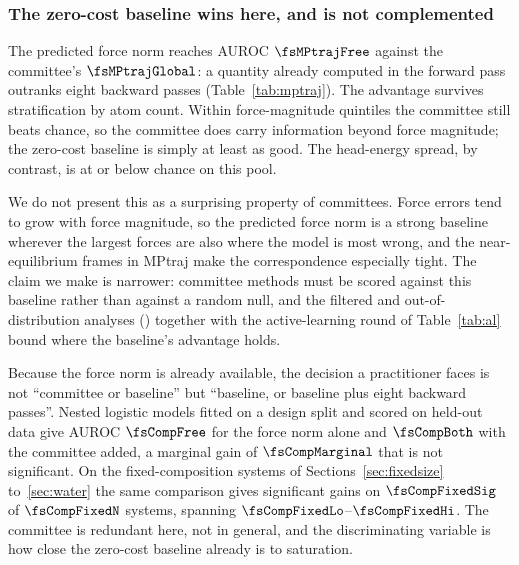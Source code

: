 \begin{table}[t]
\centering
\caption{\textbf{On the in-distribution materials pool a zero-cost baseline
outranks every committee score.} AUROC on $\fsMPtrajN$ MPtraj structures under a
frozen foundation-model trunk, for four error targets. The row labelled
$\|\bar{f}\|$ is the predicted force norm, a by-product of the forward pass; the
row labelled energy std is the spread of the head energies; the row labelled
leading-only is the deterministic leading-subspace estimator at five backward
passes. The last two columns are post-hoc diagnostics: AUROC recomputed within
atom-count quartiles and within force-magnitude quintiles, so that neither the
size bias nor force magnitude itself can explain the ordering. The predicted
force norm is in bold because it costs nothing.}
\label{tab:mptraj}
\small

\end{table}

\subsubsection{The zero-cost baseline wins here, and is not complemented}

The predicted force norm reaches AUROC $\fsMPtrajFree$ against the committee's
$\fsMPtrajGlobal$: a quantity already computed in the forward pass outranks
eight backward passes (Table~\ref{tab:mptraj}). The advantage survives
stratification by atom count. Within force-magnitude quintiles the committee
still beats chance, so the committee does carry information beyond force
magnitude; the zero-cost baseline is simply at least as good. The head-energy
spread, by contrast, is at or below chance on this pool.

We do not present this as a surprising property of committees. Force errors
tend to grow with force magnitude, so the predicted force norm is a strong
baseline wherever the largest forces are also where the model is most wrong,
and the near-equilibrium frames in MPtraj make the correspondence especially
tight. The claim we make is narrower: committee methods must be scored against
this baseline rather than against a random null, and the filtered and
out-of-distribution analyses () together with the active-learning round of
Table~\ref{tab:al} bound where the baseline's advantage holds.

Because the force norm is already available, the decision a practitioner faces
is not ``committee or baseline'' but ``baseline, or baseline plus eight
backward passes''. Nested logistic models fitted on a design split and scored
on held-out data give AUROC $\fsCompFree$ for the force norm alone and
$\fsCompBoth$ with the committee added, a marginal gain of $\fsCompMarginal$
that is not significant. On the fixed-composition systems of
Sections~\ref{sec:fixedsize} to~\ref{sec:water} the same comparison gives
significant gains on $\fsCompFixedSig$ of $\fsCompFixedN$ systems, spanning
$\fsCompFixedLo$--$\fsCompFixedHi$. The committee is redundant here, not in
general, and the discriminating variable is how close the zero-cost baseline
already is to saturation.


